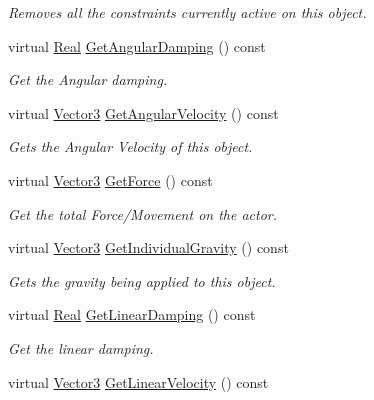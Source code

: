 \begin{DoxyCompactItemize}
\begin{DoxyCompactList}\small\item\em Removes all the constraints currently active on this object. \end{DoxyCompactList}\item 
virtual \hyperlink{namespaceMezzanine_a726731b1a7df72bf3583e4a97282c6f6}{Real} \hyperlink{classMezzanine_1_1ActorRigidPhysicsSettings_afadd3d7e1cee938622fc3781543489eb}{Get\-Angular\-Damping} () const 
\begin{DoxyCompactList}\small\item\em Get the Angular damping. \end{DoxyCompactList}\item 
virtual \hyperlink{classMezzanine_1_1Vector3}{Vector3} \hyperlink{classMezzanine_1_1ActorRigidPhysicsSettings_a5b078e767c73636afbabc0434f7af8c7}{Get\-Angular\-Velocity} () const 
\begin{DoxyCompactList}\small\item\em Gets the Angular Velocity of this object. \end{DoxyCompactList}\item 
virtual \hyperlink{classMezzanine_1_1Vector3}{Vector3} \hyperlink{classMezzanine_1_1ActorRigidPhysicsSettings_af5b4641d041c0dcbba8ef0a28566ca87}{Get\-Force} () const 
\begin{DoxyCompactList}\small\item\em Get the total Force/\-Movement on the actor. \end{DoxyCompactList}\item 
virtual \hyperlink{classMezzanine_1_1Vector3}{Vector3} \hyperlink{classMezzanine_1_1ActorRigidPhysicsSettings_aec9ec4d94326545b60056043c65bdb49}{Get\-Individual\-Gravity} () const 
\begin{DoxyCompactList}\small\item\em Gets the gravity being applied to this object. \end{DoxyCompactList}\item 
virtual \hyperlink{namespaceMezzanine_a726731b1a7df72bf3583e4a97282c6f6}{Real} \hyperlink{classMezzanine_1_1ActorRigidPhysicsSettings_ac5cb8f2aa589e7c76d39fee38e8fb5e2}{Get\-Linear\-Damping} () const 
\begin{DoxyCompactList}\small\item\em Get the linear damping. \end{DoxyCompactList}\item 
virtual \hyperlink{classMezzanine_1_1Vector3}{Vector3} \hyperlink{classMezzanine_1_1ActorRigidPhysicsSettings_ad238bf0f6d19a65a79a7b8bc0fb552bd}{Get\-Linear\-Velocity} () const 

\end{DoxyCompactItemize}
